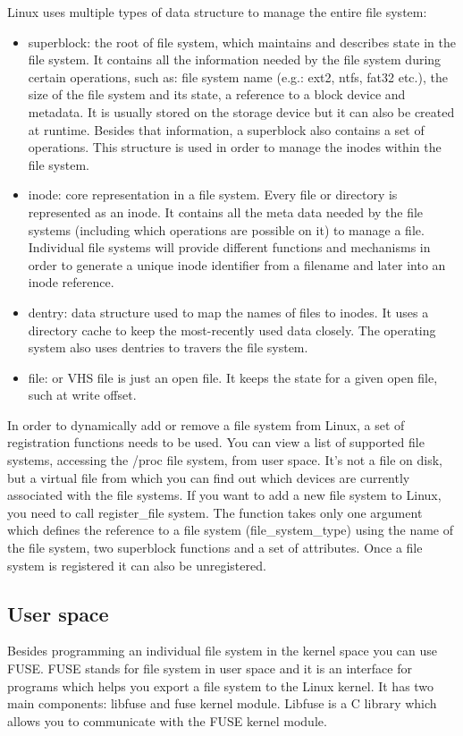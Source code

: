         Linux uses multiple types of data structure to manage the entire file system:
        \begin{itemize}
            \item superblock: the root of file system, which maintains and describes state in the file system. It contains all the information needed by the file system during certain operations, such as: file system name (e.g.: ext2, ntfs, fat32 etc.), the size of the file system and its state, a reference to a block device and metadata. It is usually stored on the storage device but it can also be created at runtime. Besides that information, a superblock also contains a set of operations. This structure is used in order to manage the inodes within the file system.
            \item inode: core representation in a file system. Every file or directory is represented as an inode.
            It contains all the meta data needed by the file systems (including which operations are possible on it) to manage a file. Individual file systems will provide different functions and mechanisms in order to generate a unique inode identifier from a filename and later into an inode reference.
            \item dentry: data structure used to map the names of files to inodes. It uses a directory cache to keep the most-recently used data closely. The operating system also uses dentries to travers the file system.
            \item file: or VHS file is just an open file. It keeps the state for a given open file, such at write offset.
        \end{itemize}

        In order to dynamically add or remove a file system from Linux, a set of registration functions needs to be used. You can view a list of supported file systems, accessing the /proc file system, from user space. It's not a file on disk, but a virtual file from which you can find out which devices are currently associated with the file systems. If you want to add a new file system to Linux, you need to call register\_file system. The function takes only one argument which defines the reference to a file system (file\_system\_type) using the name of the file system, two superblock functions and a set of attributes. Once a file system is registered it can also be unregistered.

    \subsection{User space}
        Besides programming an individual file system in the kernel space you can use FUSE. FUSE stands for file system in user space and it is an interface for programs which helps you export a file system to the Linux kernel. It has two main components: libfuse and fuse kernel module. Libfuse is a C library which allows you to communicate with the FUSE kernel module.

